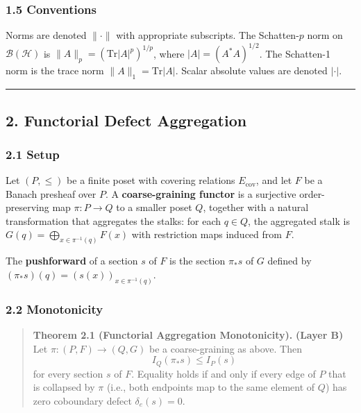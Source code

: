 \documentclass[
]{article}
\begin{document}
\subsubsection{1.5 Conventions}\label{conventions}

Norms are denoted \(\lVert \cdot \rVert\) with appropriate subscripts.
The Schatten-\(p\) norm on \(\mathcal{B}(\mathcal{H})\) is
\(\|A\|_p = (\mathrm{Tr}|A|^p)^{1/p}\), where \(|A| = (A^*A)^{1/2}\).
The Schatten-1 norm is the trace norm \(\|A\|_1 = \mathrm{Tr}|A|\).
Scalar absolute values are denoted \(|\cdot|\).

\begin{center}\rule{0.5\linewidth}{0.5pt}\end{center}

\subsection{2. Functorial Defect
Aggregation}\label{functorial-defect-aggregation}

\subsubsection{2.1 Setup}\label{setup}

Let \((P, \leq)\) be a finite poset with covering relations
\(E_{\mathrm{cov}}\), and let \(F\) be a Banach presheaf over \(P\). A
\textbf{coarse-graining functor} is a surjective order-preserving map
\(\pi: P \to Q\) to a smaller poset \(Q\), together with a natural
transformation that aggregates the stalks: for each \(q \in Q\), the
aggregated stalk is \(G(q) = \bigoplus_{x \in \pi^{-1}(q)} F(x)\) with
restriction maps induced from \(F\).

The \textbf{pushforward} of a section \(s\) of \(F\) is the section
\(\pi_* s\) of \(G\) defined by
\((\pi_* s)(q) = (s(x))_{x \in \pi^{-1}(q)}\).

\subsubsection{2.2 Monotonicity}\label{monotonicity}

\begin{quote}
\textbf{Theorem 2.1 (Functorial Aggregation Monotonicity).}
\textbf{(Layer B)} Let \(\pi: (P, F) \to (Q, G)\) be a coarse-graining
as above. Then \[I_Q(\pi_* s) \leq I_P(s)\] for every section \(s\) of
\(F\). Equality holds if and only if every edge of \(P\) that is
collapsed by \(\pi\) (i.e., both endpoints map to the same element of
\(Q\)) has zero coboundary defect \(\delta_e(s) = 0\).
\end{quote}
\end{document}
